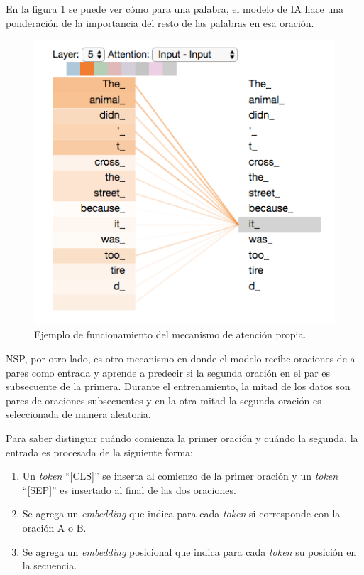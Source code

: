 En la figura \ref{fig:selfattention} se puede ver cómo para una palabra, el modelo de IA hace una ponderación de la importancia del resto de las palabras en esa oración.

\begin{figure}[htbp]
	\centering
	\includegraphics[width=.6\textwidth]{./Figures/selfattention.png}
	\caption{Ejemplo de funcionamiento del mecanismo de atención propia\protect\footnotemark.}
	\label{fig:selfattention}
\end{figure}


NSP, por otro lado, es otro mecanismo en donde el modelo recibe oraciones de a pares como entrada y aprende a predecir si la segunda oración en el par es subsecuente de la primera. Durante el entrenamiento, la mitad de los datos son pares de oraciones subsecuentes y en la otra mitad la segunda oración es seleccionada de manera aleatoria.

Para saber distinguir cuándo comienza la primer oración y cuándo la segunda, la entrada es procesada de la siguiente forma:

\begin{enumerate}
	\item Un \textit{token} ``[CLS]'' se inserta al comienzo de la primer oración y un \textit{token} ``[SEP]'' es insertado al final de las dos oraciones.
	\item Se agrega un \textit{embedding} que indica para cada \textit{token} si corresponde con la oración A o B.
	\item Se agrega un \textit{embedding} posicional que indica para cada \textit{token} su posición en la secuencia.
\end{enumerate}

